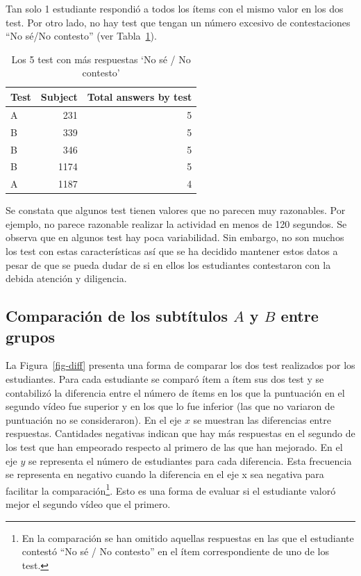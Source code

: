\documentclass[
  12pt,
  a4paper,
  extrafontsizes,
  onecolumn,
  openright,
  table]{memoir}
\begin{document}
Tan solo 1 estudiante respondió a todos los ítems con el mismo valor en
los dos test. Por otro lado, no hay test que tengan un número excesivo
de contestaciones \enquote{No sé/No contesto} (ver
Tabla~\ref{tbl-noanswer}).

\hypertarget{tbl-noanswer}{}
\begin{longtable}{lrr}
\caption{\label{tbl-noanswer}Los 5 test con más respuestas `No sé / No contesto' }\tabularnewline

\toprule
Test & Subject & Total answers by test \\ 
\midrule
A & 231 & 5 \\ 
B & 339 & 5 \\ 
B & 346 & 5 \\ 
B & 1174 & 5 \\ 
A & 1187 & 4 \\ 
\bottomrule
\end{longtable}

Se constata que algunos test tienen valores que no parecen muy
razonables. Por ejemplo, no parece razonable realizar la actividad en
menos de 120 segundos. Se observa que en algunos test hay poca
variabilidad. Sin embargo, no son muchos los test con estas
características así que se ha decidido mantener estos datos a pesar de
que se pueda dudar de si en ellos los estudiantes contestaron con la
debida atención y diligencia.

\hypertarget{sec-eda-3}{%
\subsection{\texorpdfstring{Comparación de los subtítulos \(A\) y \(B\)
entre
grupos}{Comparación de los subtítulos A y B entre grupos}}\label{sec-eda-3}}

La Figura~\ref{fig-diff} presenta una forma de comparar los dos test
realizados por los estudiantes. Para cada estudiante se comparó ítem a
ítem sus dos test y se contabilizó la diferencia entre el número de
ítems en los que la puntuación en el segundo vídeo fue superior y en los
que lo fue inferior (las que no variaron de puntuación no se
consideraron). En el eje \(x\) se muestran las diferencias entre
respuestas. Cantidades negativas indican que hay más respuestas en el
segundo de los test que han empeorado respecto al primero de las que han
mejorado. En el eje \(y\) se representa el número de estudiantes para
cada diferencia. Esta frecuencia se representa en negativo cuando la
diferencia en el eje x sea negativa para facilitar la
comparación\footnote{En la comparación se han omitido aquellas
  respuestas en las que el estudiante contestó \enquote{No sé / No
  contesto} en el ítem correspondiente de uno de los test.}. Esto es una
forma de evaluar si el estudiante valoró mejor el segundo vídeo que el
primero.
\end{document}
